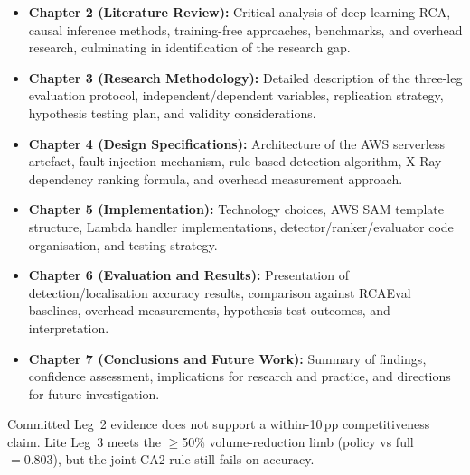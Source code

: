 \begin{itemize}
    \item \textbf{Chapter 2 (Literature Review):} Critical analysis of deep learning RCA, causal inference methods, training-free approaches, benchmarks, and overhead research, culminating in identification of the research gap.
    
    \item \textbf{Chapter 3 (Research Methodology):} Detailed description of the three-leg evaluation protocol, independent/dependent variables, replication strategy, hypothesis testing plan, and validity considerations.
    
    \item \textbf{Chapter 4 (Design Specifications):} Architecture of the AWS serverless artefact, fault injection mechanism, rule-based detection algorithm, X-Ray dependency ranking formula, and overhead measurement approach.
    
    \item \textbf{Chapter 5 (Implementation):} Technology choices, AWS SAM template structure, Lambda handler implementations, detector/ranker/evaluator code organisation, and testing strategy.
    
    \item \textbf{Chapter 6 (Evaluation and Results):} Presentation of detection/localisation accuracy results, comparison against RCAEval baselines, overhead measurements, hypothesis test outcomes, and interpretation.
    
    \item \textbf{Chapter 7 (Conclusions and Future Work):} Summary of findings, confidence assessment, implications for research and practice, and directions for future investigation.
\end{itemize}

Committed Leg~2 evidence does not support a within-10\,pp competitiveness claim. Lite Leg~3 meets the $\geq$50\% volume-reduction limb (policy vs full $=0.803$), but the joint CA2 rule still fails on accuracy.
